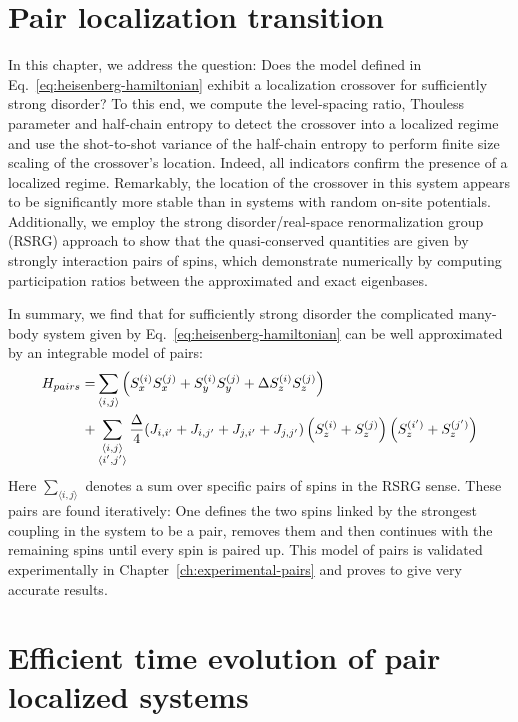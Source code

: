 \chapter{Pair localization transition}\label{ch:pair-localization-transition}
In this chapter, we address the question: Does the model defined in Eq.~\ref{eq:heisenberg-hamiltonian} exhibit a localization crossover for sufficiently strong disorder? To this end, we compute the level-spacing ratio, Thouless parameter and half-chain entropy to detect the crossover into a localized regime and use the shot-to-shot variance of the half-chain entropy to perform finite size scaling of the crossover's location. Indeed, all indicators confirm the presence of a localized regime. Remarkably, the location of the crossover in this system appears to be significantly more stable than in systems with random on-site potentials. Additionally, we employ the strong disorder/real-space renormalization group (RSRG) approach to show that the quasi-conserved quantities are given by strongly interaction pairs of spins, which demonstrate numerically by computing participation ratios between the approximated and exact eigenbases.

In summary, we find that for sufficiently strong disorder the complicated many-body system given by Eq.~\ref{eq:heisenberg-hamiltonian} can be well approximated by an integrable model of pairs:
\begin{align}\label{eq:pair-model}
	H_{pairs} =& \sum_{\langle i,j\rangle} \left(S_x^{(i)}S_x^{(j)} + S_y^{(i)}S_y^{(j)} + \Delta S_z^{(i)}S_z^{(j)}\right) \notag\\
	+ &\sum_{\substack{\langle i,j\rangle\\\langle i',j'\rangle}} \frac{\Delta}{4}(J_{i,i'}+J_{i,j'}+J_{j,i'}+J_{j,j'})\left(S_z^{(i)}+S_z^{(j)}\right)\left(S_z^{(i')}+S_z^{(j')}\right)
\end{align}
Here $\sum_{\langle i,j\rangle}$ denotes a sum over specific pairs of spins in the RSRG sense. These pairs are found iteratively: One defines the two spins linked by the strongest coupling in the system to be a pair, removes them and then continues with the remaining spins until every spin is paired up. This model of pairs is validated experimentally in Chapter~\ref{ch:experimental-pairs} and proves to give very accurate results.

\newpage
{}


\chapter{Efficient time evolution of pair localized systems}\label{ch:cTWA-paper}

